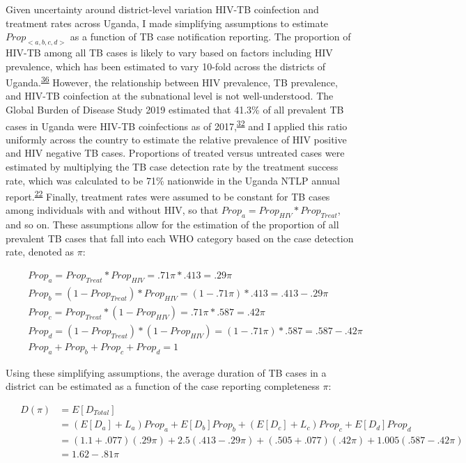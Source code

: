 \documentclass[
]{article}
\begin{document}
Given uncertainty around district-level variation HIV-TB coinfection and treatment rates across Uganda, I made simplifying assumptions to estimate \(Prop_{<a,b,c,d>}\) as a function of TB case notification reporting. The proportion of HIV-TB among all TB cases is likely to vary based on factors including HIV prevalence, which has been estimated to vary 10-fold across the districts of Uganda.\textsuperscript{\protect\hyperlink{ref-Dwyer-Lindgren2019}{36}} However, the relationship between HIV prevalence, TB prevalence, and HIV-TB coinfection at the subnational level is not well-understood. The Global Burden of Disease Study 2019 estimated that 41.3\% of all prevalent TB cases in Uganda were HIV-TB coinfections as of 2017,\textsuperscript{\protect\hyperlink{ref-Ledesma2021}{32}} and I applied this ratio uniformly across the country to estimate the relative prevalence of HIV positive and HIV negative TB cases. Proportions of treated versus untreated cases were estimated by multiplying the TB case detection rate by the treatment success rate, which was calculated to be 71\% nationwide in the Uganda NTLP annual report.\textsuperscript{\protect\hyperlink{ref-UgandaNationalTuberculosisandLeprosyProgramme2018}{22}} Finally, treatment rates were assumed to be constant for TB cases among individuals with and without HIV, so that \(Prop_a = Prop_{HIV}* Prop_{Treat}\), and so on. These assumptions allow for the estimation of the proportion of all prevalent TB cases that fall into each WHO category based on the case detection rate, denoted as \(\pi\):

\begin{math}\begin{aligned}
\;\;\;\;&Prop_a = Prop_{Treat} * Prop_{HIV} = .71\pi * .413 = .29\pi \\
&Prop_b = (1-Prop_{Treat})*Prop_{HIV} = (1-.71\pi)*.413 = .413 - .29\pi \\
&Prop_c = Prop_{Treat} * (1-Prop_{HIV}) = .71\pi * .587 = .42\pi \\
&Prop_d = (1-Prop_{Treat}) * (1-Prop_{HIV}) = (1-.71\pi) * .587 = .587 - .42\pi \\
&Prop_a + Prop_b + Prop_c + Prop_d = 1
\end{aligned}\end{math}

Using these simplifying assumptions, the average duration of TB cases in a district can be estimated as a function of the case reporting completeness \(\pi\):

\begin{math}\begin{aligned}
\;\;\;\;D(\pi) &= E[D_{Total}] \\
  &= (E[D_a] + L_a) Prop_a + E[D_b]Prop_b + (E[D_c] + L_c)Prop_c + E[D_d]Prop_d \\
  &= (1.1 + .077)(.29\pi) + 2.5(.413-.29\pi)+(.505+.077)(.42\pi)+1.005(.587-.42\pi) \\
  &= 1.62 - .81\pi
\end{aligned}\end{math}
\end{document}
